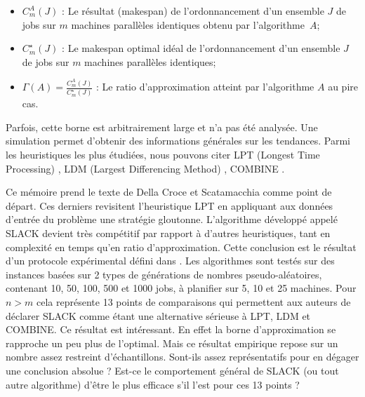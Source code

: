 \documentclass[a4paper,12pt]{report}
\theoremstyle{plain}				%
\theoremstyle{definition}				%
\newcommand\dcs{Della Croce et Scatamacchia\xspace}
\begin{document}
\begin{itemize}
	\item $C_m^A(J)$ : Le résultat (makespan) de l'ordonnancement
	d'un ensemble $J$ de jobs 
	sur $m$ machines parallèles identiques 
	obtenu par l'algorithme~$A$;

	\item $C_m^\star(J)$ : Le makespan optimal idéal de l'ordonnancement 
  	d'un ensemble $J$ de jobs 
	sur $m$ machines parallèles identiques;
	
	\item $\Gamma(A)=\frac{C_m^A(J)}{C_m^\star(J)}$ : Le ratio d'approximation 
	atteint par l'algorithme $A$ au pire cas.
	
\end{itemize}
   
Parfois, cette borne est arbitrairement large et n'a pas été analysée. Une simulation permet d'obtenir des 
  informations générales sur les tendances.
Parmi les heuristiques les plus étudiées, nous pouvons citer 
  LPT (Longest Time Processing) \cite{graham1966bounds}, 
  LDM (Largest Differencing Method) \cite{karmarkar1982differencing}, 
  COMBINE \cite{lee1988multiprocessor}.
  
\bigskip
Ce mémoire prend le texte de \dcs \cite{della2020longest} comme point de départ.    
Ces derniers revisitent l'heuristique LPT en appliquant aux données d'entrée du problème une stratégie gloutonne.  
L'algorithme développé appelé SLACK devient très compétitif par rapport à d'autres heuristiques, 
  tant en complexité en temps qu'en ratio d'approximation. 
Cette conclusion est le résultat d'un protocole expérimental défini dans \cite{iori2008scatter}. 
Les algorithmes sont testés sur des instances basées sur 2 types de générations de nombres pseudo-aléatoires, contenant 10, 50, 100, 500 et 1000 jobs, à planifier sur 5, 10 et 25 machines. 
Pour $n > m$ cela représente 13 points de comparaisons qui permettent aux auteurs de déclarer SLACK comme étant une alternative sérieuse à LPT, LDM et COMBINE. 
Ce résultat est intéressant. En effet la borne d'approximation se rapproche un peu plus de l'optimal. 
Mais ce résultat empirique repose sur un nombre assez restreint d'échantillons. Sont-ils assez représentatifs pour en dégager une conclusion absolue ? Est-ce le comportement général de SLACK (ou tout autre algorithme) d'être le plus efficace s'il l'est pour ces 13 points ? 
\end{document}
